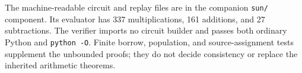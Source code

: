 The machine-readable circuit and replay files are in the companion
\texttt{sun/} component. Its evaluator has 337 multiplications, 161
additions, and 27 subtractions. The verifier imports no circuit builder
and passes both ordinary Python and \texttt{python -O}. Finite borrow,
population, and source-assignment tests supplement the unbounded proofs;
they do not decide consistency or replace the inherited arithmetic
theorems.
